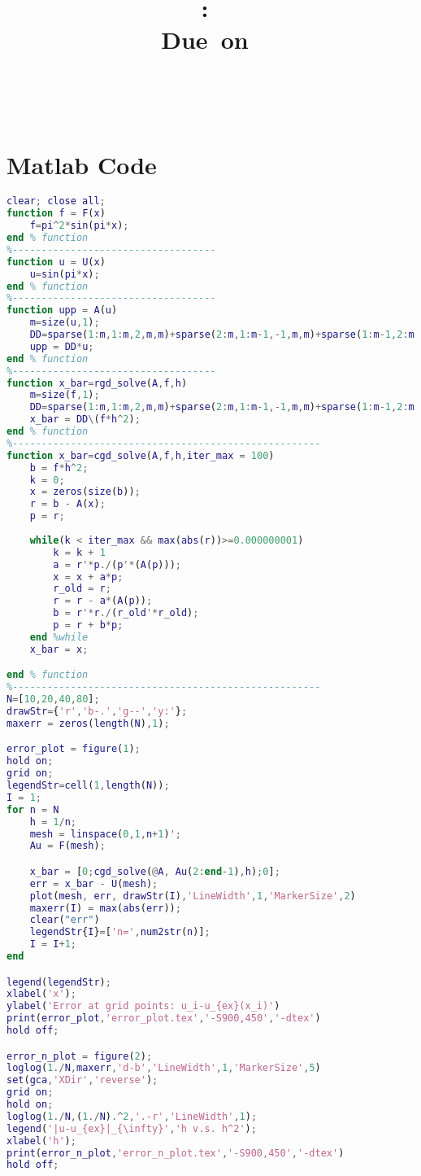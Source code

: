 \documentclass{article}
\title{
	\vspace{2in}
	\textmd{\textbf{\hmwkClass:\ \hmwkTitle}}\\
		\normalsize\vspace{0.1in}\small{Due\ on\ \hmwkDueDate}
	\vspace{3in}
}
\author{
	\textbf{\hmwkAuthorName}\\
		\textbf{\MatricNumber}\\
		\textbf{\AuthorDescription}
}
\date{} %
\begin{document}
\maketitle




\newpage
\section{Matlab Code}
\begin{lstlisting}[language=Matlab]
clear; close all;
function f = F(x)
	f=pi^2*sin(pi*x);
end % function
%-----------------------------------
function u = U(x)
	u=sin(pi*x);
end % function
%-----------------------------------
function upp = A(u)
	m=size(u,1);
	DD=sparse(1:m,1:m,2,m,m)+sparse(2:m,1:m-1,-1,m,m)+sparse(1:m-1,2:m,-1,m,m);
	upp = DD*u;
end % function
%-----------------------------------
function x_bar=rgd_solve(A,f,h)
	m=size(f,1);
	DD=sparse(1:m,1:m,2,m,m)+sparse(2:m,1:m-1,-1,m,m)+sparse(1:m-1,2:m,-1,m,m);
	x_bar = DD\(f*h^2);
end % function
%-----------------------------------------------------
function x_bar=cgd_solve(A,f,h,iter_max = 100)
	b = f*h^2;
	k = 0;
	x = zeros(size(b));
	r = b - A(x);
	p = r;
	
	while(k < iter_max && max(abs(r))>=0.000000001)
		k = k + 1
		a = r'*p./(p'*(A(p)));
		x = x + a*p;
		r_old = r;
		r = r - a*(A(p));
		b = r'*r./(r_old'*r_old);
		p = r + b*p;
	end %while
	x_bar = x;

end % function
%-----------------------------------------------------
N=[10,20,40,80];
drawStr={'r','b-.','g--','y:'};
maxerr = zeros(length(N),1);

error_plot = figure(1);
hold on;
grid on;
legendStr=cell(1,length(N));
I = 1;
for n = N
	h = 1/n;
	mesh = linspace(0,1,n+1)';
    Au = F(mesh);

	x_bar = [0;cgd_solve(@A, Au(2:end-1),h);0];
	err = x_bar - U(mesh);
    plot(mesh, err, drawStr(I),'LineWidth',1,'MarkerSize',2)
    maxerr(I) = max(abs(err));
	clear("err")
	legendStr{I}=['n=',num2str(n)];
	I = I+1;
end

legend(legendStr);
xlabel('x');
ylabel('Error at grid points: u_i-u_{ex}(x_i)')
print(error_plot,'error_plot.tex','-S900,450','-dtex')
hold off;

error_n_plot = figure(2);
loglog(1./N,maxerr,'d-b','LineWidth',1,'MarkerSize',5)
set(gca,'XDir','reverse');
grid on;
hold on; 
loglog(1./N,(1./N).^2,'.-r','LineWidth',1);
legend('|u-u_{ex}|_{\infty}','h v.s. h^2');
xlabel('h');
print(error_n_plot,'error_n_plot.tex','-S900,450','-dtex')
hold off;
\end{lstlisting}  
\end{document}

